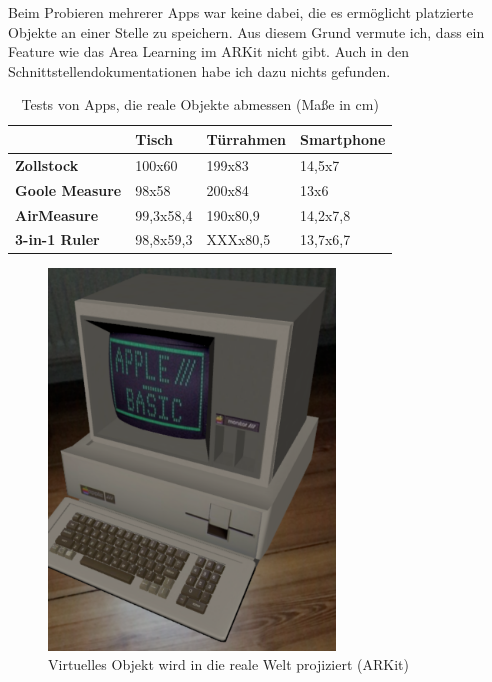 Beim Probieren mehrerer Apps war keine dabei, die es ermöglicht platzierte Objekte an einer Stelle zu speichern. Aus diesem Grund vermute ich, dass ein Feature wie das Area Learning im ARKit nicht gibt. Auch in den Schnittstellendokumentationen habe ich dazu nichts gefunden.

\begin{table}[h]
	\centering
	\begin{tabular}{|p{1.9cm}|p{1.74cm}|p{1.74cm}|p{1.74cm}|}
		\hline
		& \textbf{Tisch} & \textbf{Türrahmen} & \textbf{Smartphone}\\
		\hline
		\textbf{Zollstock} & 100x60 & 199x83 & 14,5x7\\
		\hline
		\textbf{Goole Measure} & 98x58 & 200x84 & 13x6\\
		\hline
		\textbf{AirMeasure}& 99,3x58,4 & 190x80,9 & 14,2x7,8\\
		\hline
		\textbf{3-in-1 Ruler} & 98,8x59,3 & XXXx80,5 & 13,7x6,7\\
		\hline
	\end{tabular}
	\caption{Tests von Apps, die reale Objekte abmessen (Maße in cm)}
	\label{ar_measure_apps_comparison}
\end{table}

\begin{figure}[h]
	\centering
	\includegraphics[width=3in]{pictures/arkit_object}
	\caption{Virtuelles Objekt wird in die reale Welt projiziert (ARKit)}
	\label{example_app_arkit}
\end{figure}


